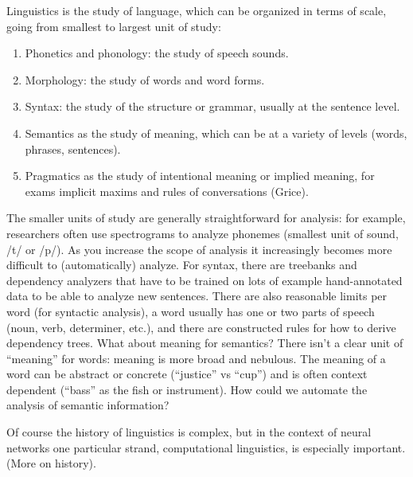 Linguistics is the study of language, which can be organized in terms of scale, going from smallest to largest unit of study: 
\begin{enumerate}
\item Phonetics and phonology: the study of speech sounds.
\item Morphology: the study of words and word forms.
\item Syntax: the study of the structure or grammar, usually at the sentence level.
\item Semantics as the study of meaning, which can be at a variety of levels (words, phrases, sentences).
\item Pragmatics as the study of intentional meaning or implied meaning, for exams implicit maxims and rules of conversations (Grice). 
\end{enumerate}

The smaller units of study are generally straightforward for analysis: for example, researchers often use spectrograms to analyze phonemes (smallest unit of sound, /t/ or /p/). As you increase the scope of analysis it increasingly becomes more difficult to (automatically) analyze. For syntax, there are treebanks and dependency analyzers that have to be trained on lots of example hand-annotated data to be able to analyze new sentences. There are also reasonable limits per word (for syntactic analysis), a word usually has one or two parts of speech (noun, verb, determiner, etc.), and there are constructed rules for how to derive dependency trees. What about meaning for semantics? There isn't a clear unit of ``meaning'' for words: meaning is more broad and nebulous. The meaning of a word can be abstract or concrete (``justice'' vs ``cup'') and is often context dependent (``bass'' as the fish or instrument). How could we automate the analysis of semantic information?

Of course the history of linguistics is complex, but in the context of neural networks one particular strand, computational linguistics, is especially important. (More on history). 


